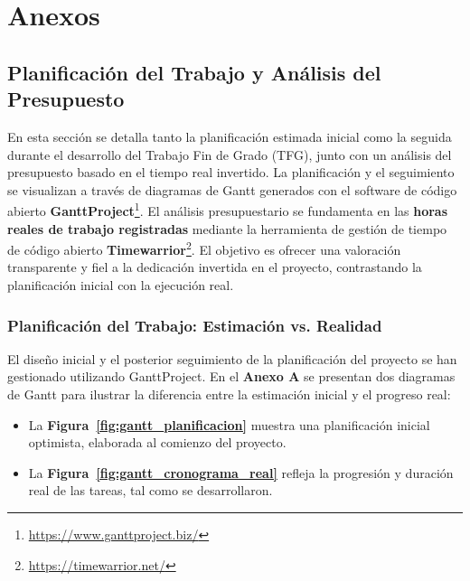 
\chapter*{Anexos} %

\section*{Planificación del Trabajo y Análisis del Presupuesto}
\label{sec:planificacion_presupuesto_intro} %

En esta sección se detalla tanto la planificación estimada inicial como la seguida durante el desarrollo del Trabajo Fin de Grado (TFG), junto con un análisis del presupuesto basado en el tiempo real invertido. La planificación y el seguimiento se visualizan a través de diagramas de Gantt generados con el software de código abierto \textbf{GanttProject}\footnote{\url{https://www.ganttproject.biz/}}. El análisis presupuestario se fundamenta en las \textbf{horas reales de trabajo registradas} mediante la herramienta de gestión de tiempo de código abierto \textbf{Timewarrior}\footnote{\url{https://timewarrior.net/}}. El objetivo es ofrecer una valoración transparente y fiel a la dedicación invertida en el proyecto, contrastando la planificación inicial con la ejecución real.

\subsection*{Planificación del Trabajo: Estimación vs. Realidad}

El diseño inicial y el posterior seguimiento de la planificación del proyecto se han gestionado utilizando GanttProject. En el \textbf{Anexo A} se presentan dos diagramas de Gantt para ilustrar la diferencia entre la estimación inicial y el progreso real:
\begin{itemize}
    \item La \textbf{Figura~\ref{fig:gantt_planificacion}} muestra una planificación inicial optimista, elaborada al comienzo del proyecto.
    \item La \textbf{Figura~\ref{fig:gantt_cronograma_real}} refleja la progresión y duración real de las tareas, tal como se desarrollaron.
\end{itemize}

